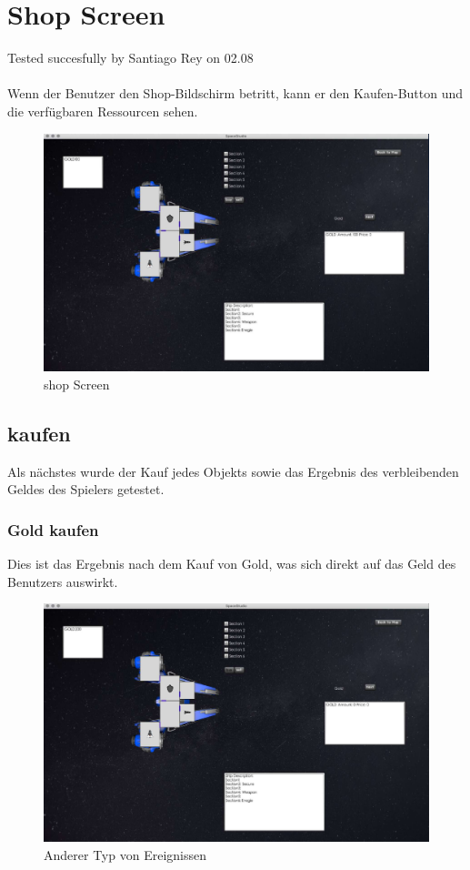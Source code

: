 \documentclass[12pt]{article}
\begin{document}
\section{Shop Screen}
Tested succesfully by Santiago Rey on 02.08\\\\
Wenn der Benutzer den Shop-Bildschirm betritt, kann er den Kaufen-Button und die verfügbaren Ressourcen sehen.
\begin{figure}[h]
\centering
\includegraphics[scale=0.4]{TestProtocolBilder/shopScreen.jpg}
\caption{shop Screen}
\end{figure}

\subsection{kaufen}
Als nächstes wurde der Kauf jedes Objekts sowie das Ergebnis des verbleibenden Geldes des Spielers getestet.

\subsubsection{Gold kaufen}
Dies ist das Ergebnis nach dem Kauf von Gold, was sich direkt auf das Geld des Benutzers auswirkt.
\begin{figure}[htp]
\centering
\includegraphics[scale=0.4]{TestProtocolBilder/goldgekauft.jpg}
\caption{Anderer Typ von Ereignissen}
\end{figure}
\newpage
\end{document}
